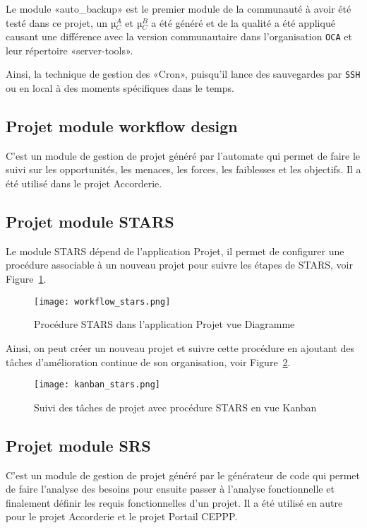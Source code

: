 Le module «auto\_backup» est le premier module de la communauté à avoir été testé dans ce projet, un µ$_C^A$ et µ$_C^B$ a été généré et de la qualité a été appliqué causant une différence avec la version communautaire dans l’organisation \texttt{OCA} et leur répertoire «server-tools».

Ainsi, la technique de gestion des «Cron», puisqu’il lance des sauvegardes par \texttt{SSH} ou en local à des moments spécifiques dans le temps.

\subsection{Projet module workflow design}

C’est un module de gestion de projet généré par l’automate qui permet de faire le suivi sur les opportunités, les menaces, les forces, les faiblesses et les objectifs. Il a été utilisé dans le projet Accorderie.

\subsection{Projet module STARS}

Le module STARS dépend de l’application Projet, il permet de configurer une procédure associable à un nouveau projet pour suivre les étapes de STARS, voir Figure~\ref{fig:workflow_stars}.

\begin{figure}
\centering
\texttt{[image: workflow\_stars.png]}
\caption{Procédure STARS dans l'application Projet vue Diagramme}
\label{fig:workflow_stars}
\end{figure}

Ainsi, on peut créer un nouveau projet et suivre cette procédure en ajoutant des tâches d'amélioration continue de son organisation, voir Figure~\ref{fig:kanban_stars}.

\begin{figure}
\centering
\texttt{[image: kanban\_stars.png]}
\caption{Suivi des tâches de projet avec procédure STARS en vue Kanban}
\label{fig:kanban_stars}
\end{figure}

\subsection{Projet module SRS}

C’est un module de gestion de projet généré par le générateur de code qui permet de faire l’analyse des besoins pour ensuite passer à l’analyse fonctionnelle et finalement définir les requis fonctionnelles d’un projet. Il a été utilisé en autre pour le projet Accorderie et le projet Portail CEPPP.

